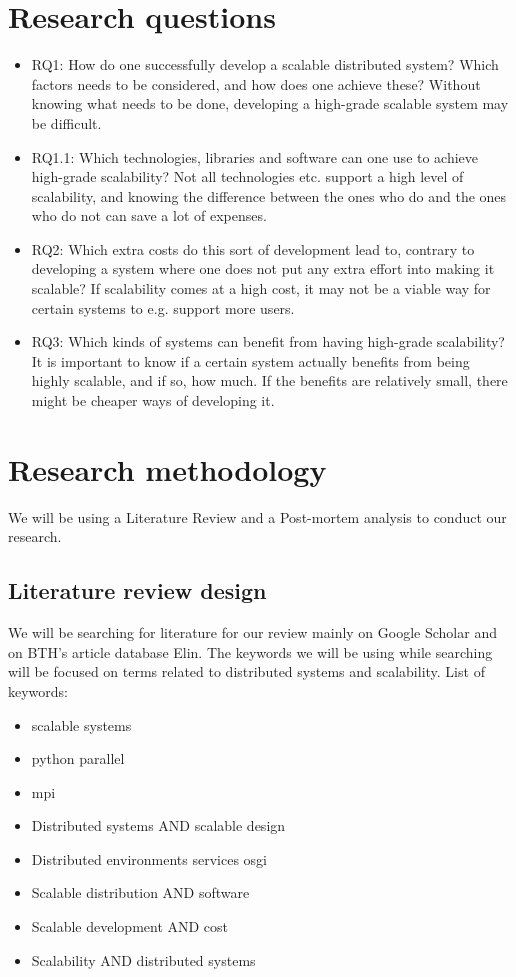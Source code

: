 \documentclass{article}
\begin{document}
\newpage

\section{Research questions}
\begin{itemize}
\item{RQ1: How do one successfully develop a scalable distributed system? Which
factors needs to be considered, and how does one achieve these? Without knowing
what needs to be done, developing a high-grade scalable system may be
difficult.} 

\item{RQ1.1: Which technologies, libraries and software can one use to achieve
high-grade scalability? Not all technologies etc. support a high level of
scalability, and knowing the difference between the ones who do and the ones
who do not can save a lot of expenses.}

\item{RQ2: Which extra costs do this sort of development lead to, contrary to
developing a system where one does not put any extra effort into making it
scalable? If scalability comes at a high cost, it may not be a viable way for
certain systems to e.g. support more users.} 

\item{RQ3: Which kinds of systems can benefit from having high-grade scalability? It
is important to know if a certain system actually benefits from being highly
scalable, and if so, how much. If the benefits are relatively small, there 
might be cheaper ways of developing it.}
\end{itemize}

\section{Research methodology}
We will be using a Literature Review and a Post-mortem analysis to conduct our 
research. 

\subsection{Literature review design}
We will be searching for literature for our review mainly on Google Scholar and
on BTH's article database Elin. The keywords we will be using while searching 
will be focused on terms related to distributed systems and scalability.
\newline
List of keywords:
\begin{itemize}
\item{scalable systems}
\item{python parallel}
\item{mpi}
\item{Distributed systems AND scalable design}
\item{Distributed environments services osgi}
\item{Scalable distribution AND software}
\item{Scalable development AND cost}
\item{Scalability AND distributed systems}
\end{itemize}
\end{document}
